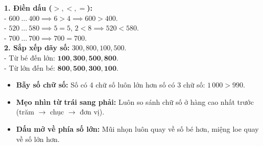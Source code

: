 \documentclass[10pt,a4paper]{article}
\begin{document}
\vspace{-1.5mm}
\noindent
\begin{minipage}[t]{0.49\textwidth}\vspace{0pt}
\begin{tcolorbox}[
  enhanced,
  colback=green!4!white,
  colframe=green!60!black,
  arc=2mm, boxrule=0.8pt,
  left=2mm, right=2mm, top=1.8mm, bottom=1.8mm,
  title={\footnotesize\bfseries\color{white}\faCheckCircle\ 4. Ví dụ mẫu điển hình}
]
{\footnotesize
\textbf{1. Điền dấu ($>, <, =$):}\\
- $600\ \dots\ 400 \implies 6 > 4 \implies 600 > 400$.\\
- $520\ \dots\ 580 \implies 5 = 5,\, 2 < 8 \implies 520 < 580$.\\
- $700\ \dots\ 700 \implies 700 = 700$.\\
\textbf{2. Sắp xếp dãy số:} $300, 800, 100, 500$.\\
- Từ bé đến lớn: $\mathbf{100, 300, 500, 800}$.\\
- Từ lớn đến bé: $\mathbf{800, 500, 300, 100}$.
}
\end{tcolorbox}
\end{minipage}
\hfill
\begin{minipage}[t]{0.49\textwidth}\vspace{0pt}
\begin{tcolorbox}[
  enhanced,
  colback=rose!4!white,
  colframe=rose!70!black,
  arc=2mm, boxrule=0.8pt,
  left=2mm, right=2mm, top=1.8mm, bottom=1.8mm,
  title={\footnotesize\bfseries\color{white}\faExclamationTriangle\ 5. Cạm bẫy \& Mẹo ghi nhớ}
]
{\footnotesize
\begin{itemize}\setlength{\itemsep}{1.5pt}\setlength{\leftskip}{-2.5mm}
  \item \textbf{Bẫy số chữ số:} Số có 4 chữ số luôn lớn hơn số có 3 chữ số: $1\,000 > 990$.
  \item \textbf{Mẹo nhìn từ trái sang phải:} Luôn so sánh chữ số ở hàng cao nhất trước (trăm $\to$ chục $\to$ đơn vị).
  \item \textbf{Dấu mở về phía số lớn:} Mũi nhọn luôn quay về số bé hơn, miệng loe quay về số lớn hơn.
\end{itemize}
}
\end{tcolorbox}
\end{minipage}
\end{document}
